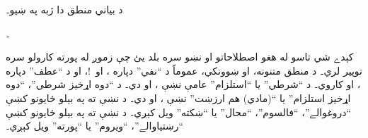 \documentclass[12pt,a4paper,oneside]{report}
\theoremstyle{definition}
\newenvironment{intro}{}{}
\begin{document}
\label{olpseg:OLP-0058-B008:start}
د بياني منطق دا ژبه په  ښيو۔
\label{olpseg:OLP-0058-B008:end}

\label{olpseg:OLP-0058-B009:start}
۔
\label{olpseg:OLP-0058-B009:end}



\label{olpseg:OLP-0058-B011:start}
\label{olpseg:OLP-0058-B011:end}

\label{olpseg:OLP-0058-B012:start}
\begin{intro}
کېدے شي تاسو له هغو اصطلاحاتو او نښو سره بلد يئ چې زموږ له پورته
کارولو سره توپير لري۔ د منطق متنونه، او ښوونکي، عموماً د ``نفي''
دپاره \LR{$\sim$}، \LR{$\neg$} او~!، او د ``عطف'' دپاره \LR{$\wedge$}، \LR{$\cdot$} او
\LR{$\&$} کاروي۔ د ``شرطي'' يا ``استلزام'' عامې نښې \LR{$\rightarrow$}،
\LR{$\Rightarrow$} او \LR{$\supset$} دي۔
د ``دوه اړخيز شرطي''، ``دوه اړخيز استلزام''
  يا ``(مادي) هم ارزښت'' نښې \LR{$\leftrightarrow$}،
  \LR{$\Leftrightarrow$} او \LR{$\equiv$} دي۔
د \LR{$\lfalse$} نښې ته په بېلو ځايونو کښې
  ``دروغوالے''، ``فالسوم''، ``محال'' يا ``ښکته'' ويل کېږي۔
د \LR{$\ltrue$} نښې ته په بېلو ځايونو کښې
  ``رښتياوالے''، ``ويروم'' يا ``پورته'' ويل کېږي۔
\end{intro}
\label{olpseg:OLP-0058-B012:end}
\end{document}
